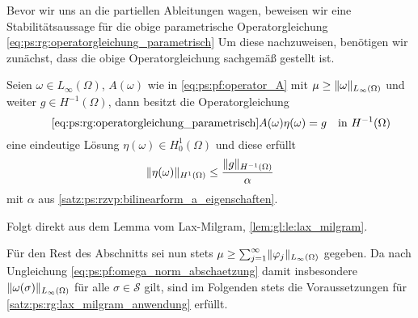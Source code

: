 Bevor wir uns an die partiellen Ableitungen wagen, beweisen wir eine Stabilitätsaussage für die obige parametrische Operatorgleichung \cref{eq:ps:rg:operatorgleichung_parametrisch}
Um diese nachzuweisen, benötigen wir zunächst, dass die obige Operatorgleichung sachgemäß gestellt ist.

\begin{Satz}
\label{satz:ps:rg:lax_milgram_anwendung}
    Seien $\omega \in L_{\infty}(\Omega)$, $A(\omega)$ wie in \cref{eq:ps:pf:operator_A} mit $\mu \geq \lVert\omega\rVert_{L_{\infty}(\Omega)}$ und weiter $g \in H^{-1}(\Omega)$, dann besitzt die Operatorgleichung
    \begin{equation}
        \tag*{\cref{eq:ps:rg:operatorgleichung_parametrisch}}
        A(\omega) \eta(\omega) = g \quad \text{in}~H^{-1}(\Omega)
    \end{equation}
    eine eindeutige Lösung $\eta(\omega) \in H^{1}_{0}(\Omega)$ und diese erfüllt
    \begin{equation}
        \lVert\eta(\omega)\rVert_{H^{1}(\Omega)} \leq \frac{\lVert g\rVert_{H^{-1}(\Omega)}}{\alpha}
    \end{equation}
    mit $\alpha$ aus \cref{satz:ps:rzvp:bilinearform_a_eigenschaften}.

    \begin{Beweis}
        Folgt direkt aus dem Lemma vom Lax-Milgram, \cref{lem:gl:le:lax_milgram}.
    \end{Beweis}
\end{Satz}

Für den Rest des Abschnitts sei nun stets $\mu \geq \sum_{j = 1}^{\infty} \lVert\varphi_{j}\rVert_{L_{\infty}(\Omega)}$ gegeben.
Da nach Ungleichung \cref{eq:ps:pf:omega_norm_abschaetzung} damit insbesondere $\lVert\omega(\sigma)\rVert_{L_{\infty}(\Omega)}$ für alle $\sigma \in \mathcal S$ gilt, sind im Folgenden stets die Voraussetzungen für \cref{satz:ps:rg:lax_milgram_anwendung} erfüllt.

